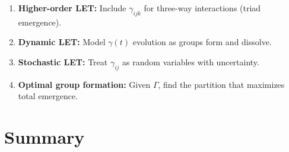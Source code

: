 \begin{enumerate}
\item \textbf{Higher-order LET:} Include $\gamma_{ijk}$ for three-way
interactions (triad emergence).

\item \textbf{Dynamic LET:} Model $\gamma(t)$ evolution as groups form
and dissolve.

\item \textbf{Stochastic LET:} Treat $\gamma_{ij}$ as random variables
with uncertainty.

\item \textbf{Optimal group formation:} Given $\Gamma$, find the
partition that maximizes total emergence.
\end{enumerate}


\section{Summary}
\label{sec:let-summary}

